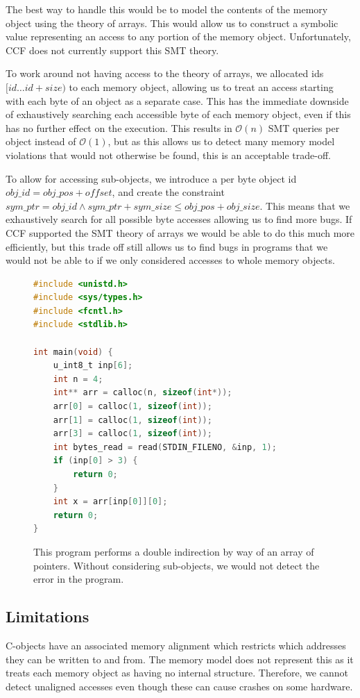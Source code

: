 \documentclass[12pt,twoside]{report}
\begin{document}
The best way to handle this would be to model the contents of the memory object using the theory of arrays. This would allow us to construct a symbolic value representing an access to any portion of the memory object. Unfortunately, CCF does not currently support this SMT theory.

To work around not having access to the theory of arrays, we allocated ids $[id \dots id + size)$ to each memory object, allowing us to treat an access starting with each byte of an object as a separate case. This has the immediate downside of exhaustively searching each accessible byte of each memory object, even if this has no further effect on the execution. This results in $\mathcal{O}(n)$ SMT queries per object instead of $\mathcal{O}(1)$, but as this allows us to detect many memory model violations that would not otherwise be found, this is an acceptable trade-off.

To allow for accessing sub-objects, we introduce a per byte object id $obj\_id = obj\_pos + offset$, and create the constraint $sym\_ptr = obj\_id \wedge sym\_ptr + sym\_size\leq obj\_pos + obj\_size$. This means that we exhaustively search for all possible byte accesses allowing us to find more bugs. If CCF supported the SMT theory of arrays we would be able to do this much more efficiently, but this trade off still allows us to find bugs in programs that we would not be able to if we only considered accesses to whole memory objects.

\begin{figure}
    \centering
    \begin{lstlisting}[language=C]
#include <unistd.h>
#include <sys/types.h>
#include <fcntl.h>
#include <stdlib.h>

int main(void) {
    u_int8_t inp[6];
    int n = 4;
    int** arr = calloc(n, sizeof(int*));
    arr[0] = calloc(1, sizeof(int));
    arr[1] = calloc(1, sizeof(int));
    arr[3] = calloc(1, sizeof(int));
    int bytes_read = read(STDIN_FILENO, &inp, 1);
    if (inp[0] > 3) {
        return 0;
    }
    int x = arr[inp[0]][0];
    return 0;
}
\end{lstlisting}
    \caption{This program performs a double indirection by way of an array of pointers. Without considering sub-objects, we would not detect the error in the program.}
    \label{DoubleIndirection}
\end{figure}


\subsection{Limitations}
C-objects have an associated memory alignment which restricts which addresses they can be written to and from. The memory model does not represent this as it treats each memory object as having no internal structure. Therefore, we cannot detect unaligned accesses even though these can cause crashes on some hardware.
\end{document}
